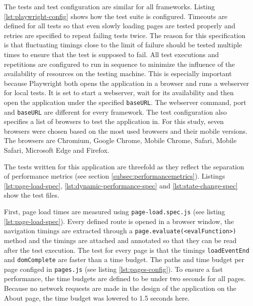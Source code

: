 \documentclass[a4paper, 12pt]{article}
\begin{document}
\vspace{1cm}

The tests and test configuration are similar for all frameworks.
Listing \ref{lst:playwright-config} shows how the test suite is configured.
Timeouts are defined for all tests so that even slowly loading pages are tested properly and retries are specified to repeat failing tests twice.
The reason for this specification is that fluctuating timings close to the limit of failure should be tested multiple times to ensure that the test is supposed to fail.
All test executions and repetitions are configured to run in sequence to minimize the influence of the availability of resources on the testing machine.
This is especially important because Playwright both opens the application in a browser and runs a webserver for local tests.
It is set to start a webserver, wait for its availability and then open the application under the specified \verb|baseURL|.
The webserver command, port and \verb|baseURL| are different for every framework.
The test configuration also specifies a list of browsers to test the application in.
For this study, seven browsers were chosen based on the most used browsers \citep{browserUsage} and their mobile versions.
The browsers are Chromium, Google Chrome, Mobile Chrome, Safari, Mobile Safari, Microsoft Edge and Firefox.

The tests written for this application are threefold as they reflect the separation of performance metrics (see section \ref{subsec:performancemetrics}).
Listings \ref{lst:page-load-spec}, \ref{lst:dynamic-performance-spec} and \ref{lst:state-change-spec} show the test files.

First, page load times are measured using \verb|page-load.spec.js| (see listing \ref{lst:page-load-spec}).
Every defined route is opened in a browser window, the navigation timings are extracted through a \verb|page.evaluate(<evalFunction>)| method and the timings are attached and annotated so that they can be read after the test execution.
The test for every page is that the timings \verb|loadEventEnd| and \verb|domComplete| are faster than a time budget.
The paths and time budget per page configed in \verb|pages.js| (see listing \ref{lst:pages-config}).
To ensure a fast performance, the time budgets are defined to be under two seconds for all pages.
Because no network requests are made in the design of the application on the About page, the time budget was lowered to 1.5 seconds here.
\end{document}
